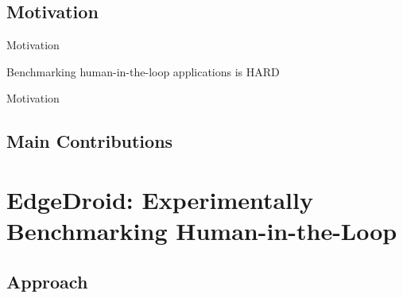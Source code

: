 \documentclass[aspectratio=1610]{beamer}
\begin{document}
\subsection{Motivation}
\begin{frame}{Motivation}
    \begin{Large}
        \centering%
        Benchmarking human-in-the-loop applications is HARD\\
    \end{Large}
\end{frame}

\begin{frame}{Motivation}
    \begin{center}
        \only<2>{%
        }%
    \end{center}
\end{frame}

\subsection{Main Contributions}

\section{EdgeDroid: Experimentally Benchmarking Human-in-the-Loop}
\subsection{Approach}
\end{document}
